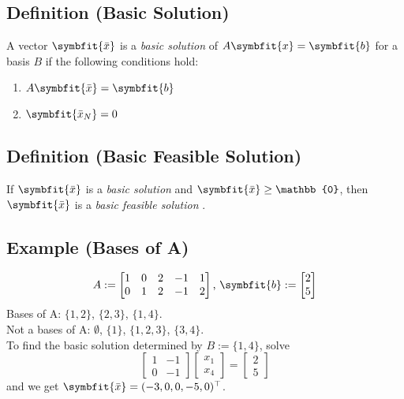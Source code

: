 \begin{defbox}
    \subsection{Definition (Basic Solution)}
    A vector $\symbfit{\bar{x}}$ is a \emph{basic solution} of $ A \symbfit{x}=\symbfit{b} $
    for a basis $ B $ if the following conditions hold:
    \begin{enumerate}[(1)]
        \item $A \symbfit{\bar{x}}=\symbfit{b}$
        \item $\symbfit{\bar{x}_N}=0$
    \end{enumerate}
\end{defbox}

\begin{defbox}
    \subsection{Definition (Basic Feasible Solution)}
    If $\symbfit{\bar{x}}$ is a \emph{basic solution} and $\symbfit{\bar{x}}\ge \mathbb{0}$,
    then $\symbfit{\bar{x}}$ is a \emph{basic feasible solution} .
\end{defbox}

\subsection{Example (Bases of A)}
\[A:=
\begin{bmatrix}
    1 & 0 & 2 & -1 & 1\\
    0 & 1 & 2 & -1 & 2
\end{bmatrix}
\text{, }
\symbfit{b}:=
\begin{bmatrix}
    2\\
    5
\end{bmatrix}
\]
Bases of A: $\{1,2\}$, $\{2,3\}$, $\{1,4\}$.\\
Not a bases of A: $\emptyset$, $\{1\}$, $\{1,2,3\}$, $\{3,4\}$.\\
To find the basic solution determined by $B:=\{1,4\}$, solve
\[
\begin{bmatrix}
    1 & -1\\
    0 & -1
\end{bmatrix}
\begin{bmatrix}
    x_1\\
    x_4
\end{bmatrix}
=
\begin{bmatrix}
    2\\
    5
\end{bmatrix}
\]
and we get $\symbfit{\bar{x}}=(-3,0,0,-5,0)^\top $.